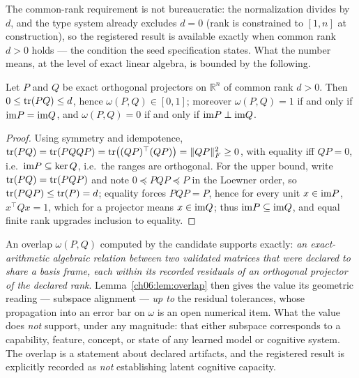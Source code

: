 The common-rank requirement is not bureaucratic: the normalization
divides by $d$, and the type system already excludes $d = 0$ (rank is
constrained to $[1, n]$ at construction), so the registered result is
available exactly when common rank $d > 0$ holds --- the condition the
seed specification states. What the number means, at the level of exact
linear algebra, is bounded by the following.

\begin{lemma}\label{ch06:lem:overlap}
Let $P$ and $Q$ be exact orthogonal projectors on $\mathbb{R}^n$ of
common rank $d > 0$. Then
$0 \le \mathrm{tr}(PQ) \le d$, hence $\omega(P,Q) \in [0,1]$; moreover
$\omega(P,Q) = 1$ if and only if $\mathrm{im} P = \mathrm{im} Q$, and
$\omega(P,Q) = 0$ if and only if $\mathrm{im} P \perp \mathrm{im} Q$.
\end{lemma}

\begin{proof}
Using symmetry and idempotence,
$\mathrm{tr}(PQ) = \mathrm{tr}(PQQP) = \mathrm{tr}\bigl((QP)^{\top} (QP)\bigr)
 = \lVert QP \rVert_F^2 \ge 0$,
with equality iff $QP = 0$, i.e.\ $\mathrm{im} P \subseteq \ker Q$, i.e.\ the
ranges are orthogonal. For the upper bound, write
$\mathrm{tr}(PQ) = \mathrm{tr}(PQP)$ and note $0 \preceq PQP \preceq P$ in the
Loewner order, so $\mathrm{tr}(PQP) \le \mathrm{tr}(P) = d$; equality forces
$PQP = P$, hence for every unit $x \in \mathrm{im} P$,
$x^{\top} Q x = 1$, which for a projector means $x \in \mathrm{im} Q$; thus
$\mathrm{im} P \subseteq \mathrm{im} Q$, and equal finite rank upgrades inclusion to
equality.
\end{proof}

\begin{ruleenv}
\label{ch06:rule:overlapclaims}
An overlap $\omega(P, Q)$ computed by the candidate supports exactly:
\emph{an exact-arithmetic algebraic relation between two validated
matrices that were declared to share a basis frame, each within its
recorded residuals of an orthogonal projector of the declared rank}.
Lemma~\ref{ch06:lem:overlap} then gives the value its geometric
reading --- subspace alignment --- \emph{up to} the residual tolerances,
whose propagation into an error bar on $\omega$ is an open numerical
item. What the value does \emph{not} support, under any magnitude: that
either subspace corresponds to a capability, feature, concept, or
state of any learned model or cognitive system. The overlap is a
statement about declared artifacts, and the registered result is
explicitly recorded as \emph{not} establishing latent cognitive
capacity.
\end{ruleenv}

